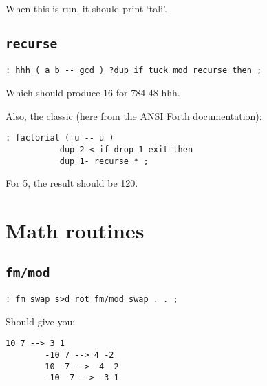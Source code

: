 \noindent When this is run, it should print `tali'.



\subsection{\texttt{recurse}}

\begin{lstlisting}[frame=lines]
        : hhh ( a b -- gcd ) ?dup if tuck mod recurse then ;
\end{lstlisting}

\noindent Which should produce 16 for 784 48 hhh. 


Also, the classic (here from the ANSI Forth documentation):

\begin{lstlisting}[frame=lines]
        : factorial ( u -- u ) 
           dup 2 < if drop 1 exit then 
           dup 1- recurse * ;
\end{lstlisting}

\noindent For 5, the result should be 120.



\section{Math routines}



\subsection{\texttt{fm/mod}}

\begin{lstlisting}[frame=lines]
        : fm swap s>d rot fm/mod swap . . ; 
\end{lstlisting}

\noindent Should give you: 
\begin{lstlisting}[frame=lines]
        10 7 --> 3 1
        -10 7 --> 4 -2 
        10 -7 --> -4 -2
        -10 -7 --> -3 1
\end{lstlisting}


